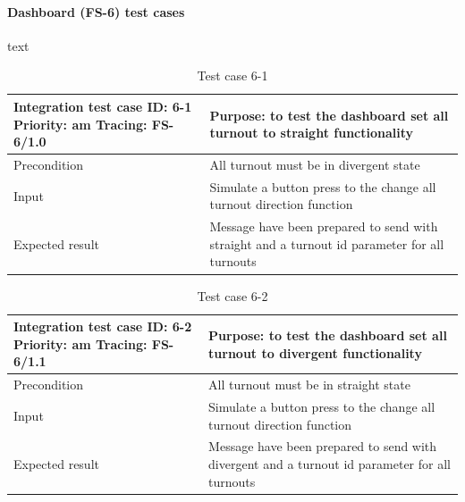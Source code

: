 \paragraph{Dashboard (FS-6) test cases} text
\begin{table}[H]
	\caption{Test case 6-1}
	\label{table:TCase-FS6-1}
	\begin{center}
		\renewcommand{\arraystretch}{1.8}
		\begin{tabu} 
			to 0.9 \textwidth
			{  X[0.4, c] X[c] }
			\toprule
			Integration test case ID: 6-1 \newline Priority: am \newline Tracing: FS-6/1.0 & Purpose: to test the dashboard set all turnout to straight functionality                     \\ \midrule
			Precondition                                                                   & All turnout must be in divergent state                                                       \\
			Input                                                                          & Simulate a button press to the change all turnout direction function                         \\
			Expected result                                                                & Message have been prepared to send with straight and a turnout id parameter for all turnouts \\ \bottomrule
		\end{tabu}
	\end{center}
\end{table}

\begin{table}[H]
	\caption{Test case 6-2}
	\label{table:TCase-FS6-2}
	\begin{center}
		\renewcommand{\arraystretch}{1.8}
		\begin{tabu} 
			to 0.9 \textwidth
			{  X[0.4, c] X[c] }
			\toprule
			Integration test case ID: 6-2 \newline Priority: am \newline Tracing: FS-6/1.1 & Purpose: to test the dashboard set all turnout to divergent functionality                     \\ \midrule
			Precondition                                                                   & All turnout must be in straight state                                                         \\
			Input                                                                          & Simulate a button press to the change all turnout direction function                          \\
			Expected result                                                                & Message have been prepared to send with divergent and a turnout id parameter for all turnouts \\ \bottomrule
		\end{tabu}
	\end{center}
\end{table}

